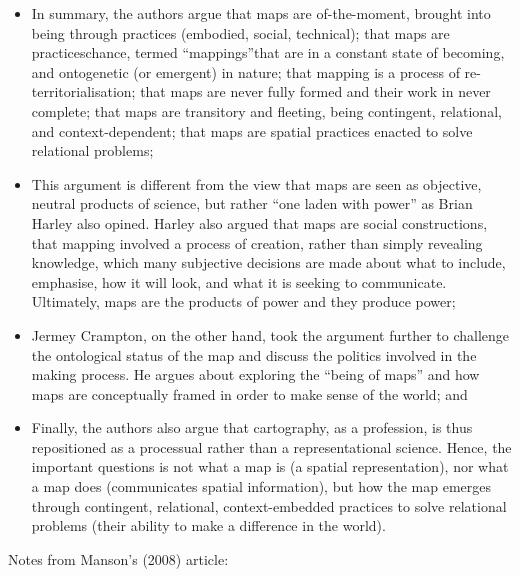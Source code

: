 \documentclass[a4paper, 10.5pt]{article} %
\begin{document}
\begin{itemize}
  \item In summary, the authors argue that maps are of-the-moment, brought into being through practices (embodied, social, technical); that maps are practices\textemdash{}chance, termed \enquote{mappings}\textemdash{}that are in a constant state of becoming, and ontogenetic (or emergent) in nature; that mapping is a process of re-territorialisation; that maps are never fully formed and their work in never complete; that maps are transitory and fleeting, being contingent, relational, and context-dependent; that maps are spatial practices enacted to solve relational problems;
  \item This argument is different from the view that maps are seen as objective, neutral products of science, but rather \enquote{one laden with power} as Brian Harley also opined. Harley also argued that maps are social constructions, that mapping involved a process of creation, rather than simply revealing knowledge, which many subjective decisions are made about what to include, emphasise, how it will look, and what it is seeking to communicate. Ultimately, maps are the products of power and they produce power;
  \item Jermey Crampton, on the other hand, took the argument further to challenge the ontological status of the map and discuss the politics involved in the making process. He argues about exploring the \enquote{being of maps} and how maps are conceptually framed in order to make sense of the world; and
  \item Finally, the authors also argue that cartography, as a profession, is thus repositioned as a processual rather than a representational science. Hence, the important questions is not what a map is (a spatial representation), nor what a map does (communicates spatial information), but how the map emerges through contingent, relational, context-embedded practices to solve relational problems (their ability to make a difference in the world).
\end{itemize}

\vspace{10pt}

Notes from Manson's (2008) article:
\end{document}
